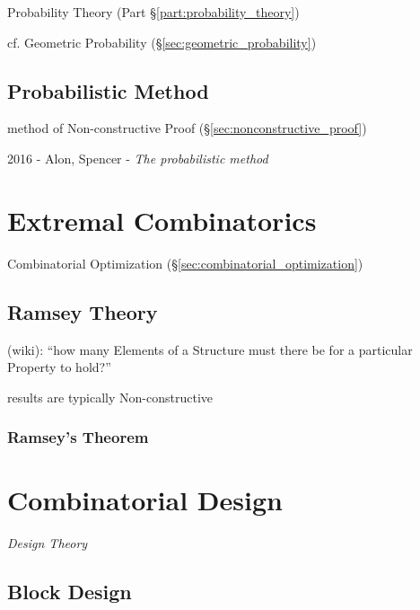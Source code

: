 Probability Theory (Part \S\ref{part:probability_theory})

cf. Geometric Probability (\S\ref{sec:geometric_probability})



\subsection{Probabilistic Method}\label{sec:probabilistic_method}

method of Non-constructive Proof (\S\ref{sec:nonconstructive_proof})

2016 - Alon, Spencer - \emph{The probabilistic method}



\section{Extremal Combinatorics}\label{sec:extremal_combinatorics}

Combinatorial Optimization (\S\ref{sec:combinatorial_optimization})



\subsection{Ramsey Theory}\label{sec:ramsey_theory}

(wiki): ``how many Elements of a Structure must there be for a particular
Property to hold?''

results are typically Non-constructive



\subsubsection{Ramsey's Theorem}\label{sec:ramseys_theorem}



\section{Combinatorial Design}\label{sec:combinatorial_design}

\emph{Design Theory}



\subsection{Block Design}\label{sec:block_design}
